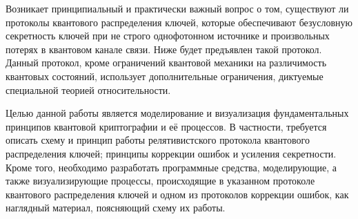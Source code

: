 Возникает принципиальный и практически важный вопрос о том, существуют ли протоколы квантового распределения ключей, которые обеспечивают безусловную секретность ключей при не строго 
однофотонном источнике и произвольных потерях в квантовом канале связи. Ниже будет предъявлен такой протокол. Данный протокол, кроме ограничений квантовой механики на различимость квантовых состояний, использует дополнительные ограничения, диктуемые специальной теорией относительности.

Целью данной работы является моделирование и визуализация фундаментальных принципов квантовой криптографии и её процессов. 
В частности, требуется описать схему и принцип работы релятивистского протокола квантового распределения ключей; принципы коррекции ошибок и усиления секретности.
Кроме того, необходимо разработать программные средства, моделирующие, а также визуализирующие процессы, происходящие в указанном протоколе квантового распределения ключей и одном из протоколов коррекции ошибок, как наглядный материал, поясняющий схему их работы.


\clearpage